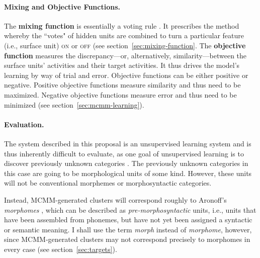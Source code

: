	\paragraph{Mixing and Objective Functions.} The \textbf{mixing function} 
is essentially a voting rule \citep{saund:94}. It prescribes the method whereby the 
``votes" of  hidden units are combined to turn a particular feature (i.e., surface unit) \textsc{on} or \textsc{off} (see section~\ref{sec:mixing-function}. The \textbf{objective function} measures the discrepancy---or, alternatively, similarity---between the surface units' activities and their target activities. 
It thus drives the model's learning by way of trial and error. Objective functions can 
be either positive or negative. Positive objective functions measure similarity and thus 
need to be maximized. Negative objective functions measure error and thus need to be minimized (see section~\ref{sec:mcmm-learning}).


\paragraph{Evaluation.} The system described in this proposal is an unsupervised learning system and is thus inherently difficult to evaluate, as one goal of unsupervised learning is to discover previously unknown categories \citep{parsons:2004}.
The previously unknown categories in this case are going to be morphological units of some kind.
However, these units will not be conventional morphemes or morphosyntactic categories. 

Instead, MCMM-generated clusters will correspond roughly to Aronoff's 
\emph{morphomes} \citep{aronoff:1994}, which can be described as \emph{pre-morphosyntactic} units, i.e.,
units that have been assembled from phonemes, but have not yet been assigned 
a syntactic or semantic meaning. I shall use the term \emph{morph} instead of 
\emph{morphome}, however, since MCMM-generated clusters may not correspond 
precisely to morphomes in every case (see section~\ref{sec:targets}).

